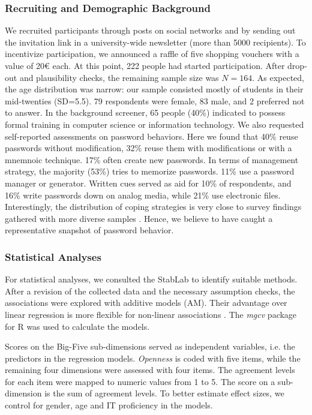 \subsubsection{Recruiting and Demographic Background}
We recruited participants through posts on social networks and by sending out the invitation link in a university-wide newsletter (more than 5000 recipients). To incentivize participation, we announced a raffle of five shopping vouchers with a value of 20€ each. At this point, 222 people had started participation. After drop-out and plausibility checks, the remaining sample size was $N=164$. As expected, the age distribution was narrow: our sample consisted mostly of students in their mid-twenties  (SD=5.5). 79 respondents were female, 83 male, and 2 preferred not to answer. In the background screener, 65 people (40\%) indicated to possess formal training in computer science or information technology. We also requested self-reported assessments on password behaviors. Here we found that 40\% reuse passwords without modification, 32\% reuse them with modifications or with a mnemnoic technique. 17\% often create new passwords. In terms of management strategy, the majority (53\%) tries to memorize passwords. 11\% use a password manager or generator. Written cues served as aid for 10\% of respondents, and 16\% write passwords down on analog media, while 21\% use electronic files. Interestingly, the distribution of coping strategies is very close to survey findings gathered with more diverse samples \cite{CSID2012PasswordHabits}. Hence, we believe to have caught a representative snapshot of password behavior.

\subsubsection{Statistical Analyses}
For statistical analyses, we consulted the StabLab to identify suitable methods. After a revision of the collected data and the necessary assumption checks, the associations were explored with additive models (AM). Their advantage over linear regression is more flexible for non-linear associations . The \textit{mgcv} package for R was used to calculate the models.

Scores on the Big-Five sub-dimensions served as independent variables, i.e. the predictors in the regression models. \textit{Openness} is coded with five items, while the remaining four dimensions were assessed with four items. The agreement levels for each item were mapped to numeric values from 1 to 5. The score on a sub-dimension is the sum of agreement levels. To better estimate effect sizes, we control for gender, age and IT proficiency in the models. 
